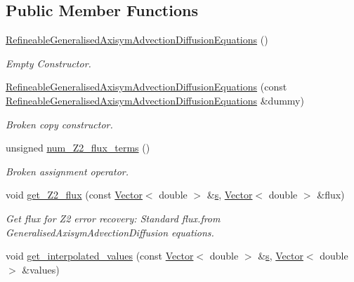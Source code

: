 \subsection*{Public Member Functions}
\begin{DoxyCompactItemize}
\item 
\hyperlink{classoomph_1_1RefineableGeneralisedAxisymAdvectionDiffusionEquations_a1b7a3a1604a525534a7af2f3a1105e43}{Refineable\+Generalised\+Axisym\+Advection\+Diffusion\+Equations} ()
\begin{DoxyCompactList}\small\item\em Empty Constructor. \end{DoxyCompactList}\item 
\hyperlink{classoomph_1_1RefineableGeneralisedAxisymAdvectionDiffusionEquations_a505509b2ab55b25e4f51d0df93cde106}{Refineable\+Generalised\+Axisym\+Advection\+Diffusion\+Equations} (const \hyperlink{classoomph_1_1RefineableGeneralisedAxisymAdvectionDiffusionEquations}{Refineable\+Generalised\+Axisym\+Advection\+Diffusion\+Equations} \&dummy)
\begin{DoxyCompactList}\small\item\em Broken copy constructor. \end{DoxyCompactList}\item 
unsigned \hyperlink{classoomph_1_1RefineableGeneralisedAxisymAdvectionDiffusionEquations_afde683f233636a412fea9793d5be89b3}{num\+\_\+\+Z2\+\_\+flux\+\_\+terms} ()
\begin{DoxyCompactList}\small\item\em Broken assignment operator. \end{DoxyCompactList}\item 
void \hyperlink{classoomph_1_1RefineableGeneralisedAxisymAdvectionDiffusionEquations_a5573e05f0eb0cf349bbb3d396dc8fc7c}{get\+\_\+\+Z2\+\_\+flux} (const \hyperlink{classoomph_1_1Vector}{Vector}$<$ double $>$ \&\hyperlink{cfortran_8h_ab7123126e4885ef647dd9c6e3807a21c}{s}, \hyperlink{classoomph_1_1Vector}{Vector}$<$ double $>$ \&flux)
\begin{DoxyCompactList}\small\item\em Get \textquotesingle{}flux\textquotesingle{} for Z2 error recovery\+: Standard flux.\+from Generalised\+Axisym\+Advection\+Diffusion equations. \end{DoxyCompactList}\item 
void \hyperlink{classoomph_1_1RefineableGeneralisedAxisymAdvectionDiffusionEquations_a1de11bc60b5ff64c82d53987f73aee38}{get\+\_\+interpolated\+\_\+values} (const \hyperlink{classoomph_1_1Vector}{Vector}$<$ double $>$ \&\hyperlink{cfortran_8h_ab7123126e4885ef647dd9c6e3807a21c}{s}, \hyperlink{classoomph_1_1Vector}{Vector}$<$ double $>$ \&values)

\end{DoxyCompactItemize}
